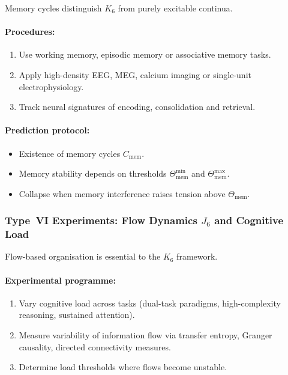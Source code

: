 Memory cycles distinguish $K_6$ from purely excitable continua.

\paragraph{Procedures:}

\begin{enumerate}
    \item Use working memory, episodic memory or associative memory tasks.
    \item Apply high-density EEG, MEG, calcium imaging or single-unit
          electrophysiology.
    \item Track neural signatures of encoding, consolidation and retrieval.
\end{enumerate}

\paragraph{Prediction protocol:}

\begin{itemize}
    \item Existence of memory cycles $C_{\mathrm{mem}}$.
    \item Memory stability depends on thresholds 
          $\Theta_{\mathrm{mem}}^{\min}$ and
          $\Theta_{\mathrm{mem}}^{\max}$.
    \item Collapse when memory interference raises tension
          above $\Theta_{\mathrm{mem}}$.
\end{itemize}



\subsubsection{Type~VI Experiments: Flow Dynamics \texorpdfstring{$J_6$}{J_6} and Cognitive Load}

Flow-based organisation is essential to the $K_6$ framework.

\paragraph{Experimental programme:}

\begin{enumerate}
    \item Vary cognitive load across tasks (dual-task paradigms,
          high-complexity reasoning, sustained attention).
    \item Measure variability of information flow 
          via transfer entropy, Granger causality,
          directed connectivity measures.
    \item Determine load thresholds where flows become unstable.
\end{enumerate}

